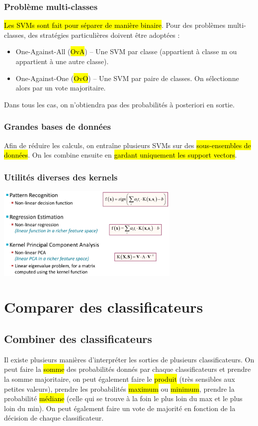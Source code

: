 \documentclass[letterpaper, 12pt]{article}
\newcommand{\alinea}{
\hspace*{0.5cm}}
\begin{document}
			\subsubsection{Problème multi-classes}
				\alinea \hl{Les SVMs sont fait pour séparer de manière binaire}. Pour des problèmes multi-classes, des stratégies 
					particulières doivent être adoptées : 
					\begin{itemize}
						\setlength\itemsep{0cm}
						\item One-Against-All (\hl{OvA}) -- Une SVM par classe (appartient à classe m ou appartient à une autre classe).
						\item One-Against-One (\hl{OvO}) -- Une SVM par paire de classes. On sélectionne alors par un vote majoritaire.
					\end{itemize}
					Dans tous les cas, on n'obtiendra pas des probabilités à posteriori en sortie.
			\subsubsection{Grandes bases de données}
				\alinea Afin de réduire les calculs, on entraîne plusieurs SVMs sur des \hl{sous-ensembles de données}. On les combine 
					ensuite en \hl{gardant uniquement les support vectors}.
			\subsubsection{Utilités diverses des kernels}
				\begin{center}
					\includegraphics[width=0.66\textwidth]{Images/kernels2}
				\end{center}
	\section{Comparer des classificateurs}
		\subsection{Combiner des classificateurs}
			\alinea Il existe plusieurs manières d'interpréter les sorties de plusieurs classificateurs. On peut faire la \hl{somme} des
				probabilités donnés par chaque classificateurs et prendre la somme majoritaire, on peut également faire le \hl{produit}
				(très sensibles aux petites valeurs), prendre les probabilités \hl{maximum} ou \hl{minimum}, prendre la probabilité 
				\hl{médiane} (celle qui se trouve à la foin le plus loin du max et le plus loin du min). On peut également
				faire un vote de majorité en fonction de la décision de chaque classificateur.
\end{document}
